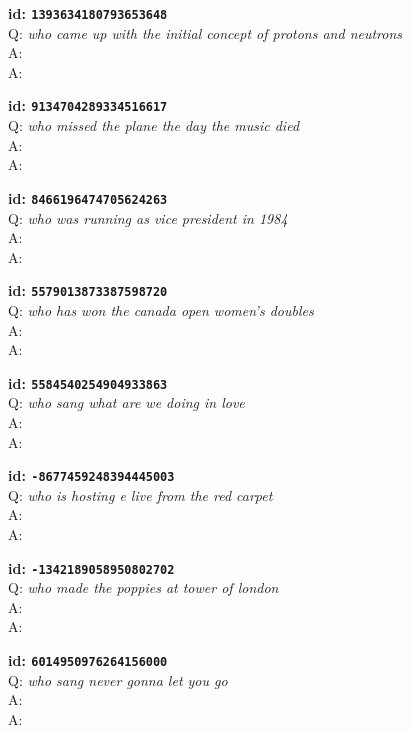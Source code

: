 \tiny{\setlength{\parindent}{0cm}
\textbf{id: \texttt{1393634180793653648}} \\
Q: \textit{who came up with the initial concept of protons and neutrons} \\
A:  \\
A: }

\tiny{\setlength{\parindent}{0cm}
\textbf{id: \texttt{9134704289334516617}} \\
Q: \textit{who missed the plane the day the music died} \\
A:  \\
A: }

\tiny{\setlength{\parindent}{0cm}
\textbf{id: \texttt{8466196474705624263}} \\
Q: \textit{who was running as vice president in 1984} \\
A:  \\
A: }

\tiny{\setlength{\parindent}{0cm}
\textbf{id: \texttt{5579013873387598720}} \\
Q: \textit{who has won the canada open women's doubles} \\
A:  \\
A: }

\tiny{\setlength{\parindent}{0cm}
\textbf{id: \texttt{5584540254904933863}} \\
Q: \textit{who sang what are we doing in love} \\
A:  \\
A: }

\tiny{\setlength{\parindent}{0cm}
\textbf{id: \texttt{-8677459248394445003}} \\
Q: \textit{who is hosting e live from the red carpet} \\
A:  \\
A: }

\tiny{\setlength{\parindent}{0cm}
\textbf{id: \texttt{-1342189058950802702}} \\
Q: \textit{who made the poppies at tower of london} \\
A:  \\
A: }

\tiny{\setlength{\parindent}{0cm}
\textbf{id: \texttt{6014950976264156000}} \\
Q: \textit{who sang never gonna let you go} \\
A:  \\
A: }

